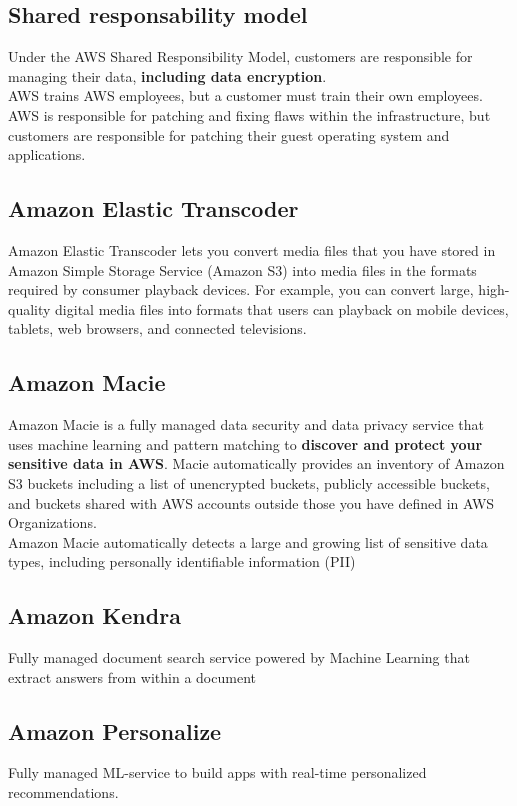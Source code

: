 \documentclass[12pt, letterpaper, twoside]{article}
\begin{document}
\subsection{Shared responsability model}
Under the AWS Shared Responsibility Model, customers are responsible for managing their data, 
\textbf{including data encryption}.\\
AWS trains AWS employees, but a customer must train their own employees.\\
AWS is responsible for patching and fixing flaws within the infrastructure, but customers are responsible for 
patching their guest operating system and applications.\\

\subsection{Amazon Elastic Transcoder}
Amazon Elastic Transcoder lets you convert media files that you have stored in Amazon Simple Storage Service (Amazon S3)
into media files in the formats required by consumer playback devices. 
For example, you can convert large, high-quality digital media files into formats that users can playback on mobile devices, 
tablets, web browsers, and connected televisions.

\subsection{Amazon Macie}
Amazon Macie is a fully managed data security and data privacy service that uses machine learning and pattern matching to \textbf{discover
and protect your sensitive data in AWS}. Macie automatically provides an inventory of Amazon S3 buckets including a list of 
unencrypted buckets, publicly accessible buckets, and buckets shared with AWS accounts outside those you have defined in AWS 
Organizations.\\
Amazon Macie automatically detects a large and growing list of sensitive data types, including personally identifiable 
information (PII)

\subsection{Amazon Kendra}
Fully managed document search service powered by Machine Learning that extract answers from within a document

\subsection{Amazon Personalize}
Fully managed ML-service to build apps with real-time personalized recommendations.\\
\end{document}
